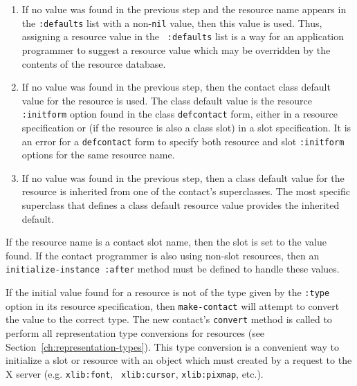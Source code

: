 \begin{flushright}
{\begin{enumerate}
\item If no value was found in the previous step and the resource name
appears in the {\tt :defaults} list  with a non-{\tt nil} value, then
this value is used. Thus, assigning a resource value in the {\tt
:defaults} list is a
way for an application programmer to suggest a resource value which may be
overridden by the contents of the resource database.

\item If no value was found in the previous step, then the contact class
default value for the resource is used.  The class default value is the
resource {\tt :initform} option found in the class {\tt defcontact} form,
either in a resource specification or (if the
resource is also a class slot) in a slot specification.  It is an error for a
{\tt defcontact} form to specify both resource and slot {\tt :initform}
options for the same resource name.

\item If no value was found in the previous step, then a class default value
for the resource is inherited from one of the contact's superclasses.  The
most specific superclass that defines a class default resource value provides
the inherited default.  \end{enumerate} }

\parbox[t]{6.125in}{
If the resource name is a contact slot name, then the slot is set to the
value found. If the contact programmer is also using non-slot resources, then an
{\tt initialize-instance :after} method must be defined to handle these values.
}


\parbox[t]{6.125in}{ If the initial value found for a resource is not of the
type given by the {\tt :type} option in its resource specification,
then
{\tt make-contact} will attempt to convert the value to the correct type.  The
new contact's {\tt convert} method is called to perform all representation type
conversions for resources (see
Section~\ref{ch:representation-types}). 
This type
conversion is a convenient way to initialize a slot or resource with an object
which must created by a request to the X server (e.g.  {\tt xlib:font}, {\tt
xlib:cursor}, {\tt xlib:pixmap}, etc.).

}\end{flushright}



